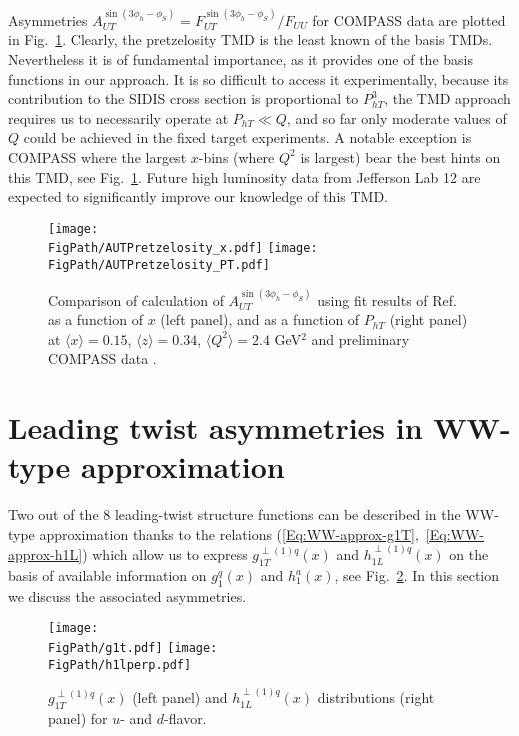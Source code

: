 \documentclass[a4paper,11pt]{article}
\newcommand{\la}{\langle}
\newcommand{\ra}{\rangle}
\def\Phperp{P_{hT}}
\newcommand*{\FigPath}{./figs}%
\begin{document}
Asymmetries $A_{UT}^{\sin(3 \phi_h - \phi_S)}=F_{UT}^{\sin(3 \phi_h - \phi_S)}/F_{UU}$ for 
COMPASS data \cite{Parsamyan:2010se} are plotted in Fig.~\ref{aut_h1tp_jlab}.
Clearly, the pretzelosity TMD is the least known of the basis TMDs.
Nevertheless it is of fundamental importance, as it provides one of the
basis functions in our approach. It is so difficult to access it 
experimentally, because its contribution to the SIDIS cross section
is proportional to $\Phperp^3$, the TMD approach requires us to
necessarily operate at $\Phperp\ll Q$, and so far only moderate
values of $Q$ could be achieved in the fixed target experiments.
A notable exception is COMPASS where the largest $x$-bins 
(where $Q^2$ is largest) bear the best hints on this TMD,
see Fig.~\ref{aut_h1tp_jlab}.
Future high luminosity data from Jefferson Lab 12 are expected 
to significantly improve our knowledge of this TMD.


\begin{figure}[b!]
\centering
\texttt{[image: \\FigPath/AUTPretzelosity\_x.pdf]}  
\texttt{[image: \\FigPath/AUTPretzelosity\_PT.pdf]}
\caption{\label{aut_h1tp_jlab}  Comparison of calculation of $A_{UT}^{\sin(3 \phi_h - \phi_S)}$  using fit results of Ref.~\cite{Lefky:2014eia} as a function of $ x $ (left panel), and   as a function of $P_{hT}$ (right panel) at $\la x\ra = 0.15$, $\la z\ra = 0.34$, $\la Q^2\ra = 2.4$ GeV$^2$ and preliminary COMPASS data \cite{Parsamyan:2010se}.
}
\end{figure}


\newpage
\section{Leading twist asymmetries in WW-type approximation}
\label{Sec-6:twist-2-and-WW}

Two out of the 8 leading-twist structure functions can be 
described in the WW-type approximation thanks to the relations 
(\ref{Eq:WW-approx-g1T},~\ref{Eq:WW-approx-h1L}) which allow us
to express $g_{1T}^{\perp (1) q}(x)$ and $h_{1L}^{\perp (1) q}(x)$ on 
the basis of available information on $g_1^q(x)$ and $h_1^a(x)$,
see Fig.~\ref{g1t_h1l_functions}.
In this section we discuss the associated asymmetries.

\begin{figure}[h!]
\centering
\texttt{[image: \\FigPath/g1t.pdf]} 
\texttt{[image: \\FigPath/h1lperp.pdf]}
	\caption{\label{g1t_h1l_functions} 
	$g^{\perp (1) q}_{1T}(x)$ (left panel) and
	$h^{\perp (1) q}_{1L}(x)$ distributions (right panel) for 
	$u$- and $d$-flavor. 
}
\end{figure}
\end{document}
